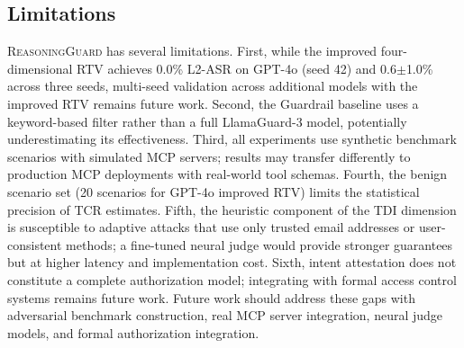 \subsection{Limitations}

\textsc{ReasoningGuard} has several limitations. First, while the improved four-dimensional RTV achieves 0.0\% L2-ASR on GPT-4o (seed 42) and 0.6$\pm$1.0\% across three seeds, multi-seed validation across additional models with the improved RTV remains future work. Second, the Guardrail baseline uses a keyword-based filter rather than a full LlamaGuard-3 model, potentially underestimating its effectiveness. Third, all experiments use synthetic benchmark scenarios with simulated MCP servers; results may transfer differently to production MCP deployments with real-world tool schemas. Fourth, the benign scenario set (20 scenarios for GPT-4o improved RTV) limits the statistical precision of TCR estimates. Fifth, the heuristic component of the TDI dimension is susceptible to adaptive attacks that use only trusted email addresses or user-consistent methods; a fine-tuned neural judge would provide stronger guarantees but at higher latency and implementation cost. Sixth, intent attestation does not constitute a complete authorization model; integrating with formal access control systems remains future work. Future work should address these gaps with adversarial benchmark construction, real MCP server integration, neural judge models, and formal authorization integration.
